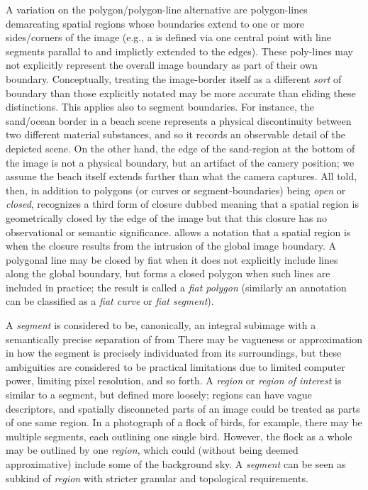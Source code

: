 {\begin{description}
A variation on the polygon/polygon-line alternative 
are polygon-lines demarcating spatial regions 
whose boundaries extend to one or more sides/corners 
of the image (e.g., a  is defined 
via one central point with line segments 
parallal to and implictly 
extended to the edges).  These poly-lines 
may not explicitly represent the overall image 
boundary as part of their own boundary.  
Conceptually, treating the image-border itself 
as a different \textit{sort} of boundary than 
those explicitly notated may be more accurate 
than eliding these distinctions.  This 
applies also to segment boundaries.  For instance, 
the sand/ocean border in a beach scene represents 
a physical discontinuity between two different 
material substances, and so it records an 
observable detail of the depicted scene.  
On the other hand, the edge of the sand-region 
at the bottom of the image is not a physical 
boundary, but an artifact of the camery position; 
we assume the beach itself extends further than 
what the camera captures.  All told, then, 
in addition to polygons (or curves or segment-boundaries) 
being \textit{open} or \textit{closed}, \AXFI{} 
recognizes a third form of closure dubbed 
 meaning that a spatial region is 
geometrically closed by the edge of the image but 
that this closure has no observational or semantic 
significance.  \lAXFI{} allows a notation that 
a spatial region is  when the closure 
results from the intrusion of the global image boundary.  
A polygonal line may be closed by fiat when it does 
not explicitly include lines along the global boundary, 
but forms a closed polygon when such lines are 
included in practice; the result is called a 
\textit{fiat polygon} (similarly an annotation 
can be classified as a \textit{fiat curve} or 
\textit{fiat segment}).
   

\item[Segments and Regions]  A \textit{segment} is 
considered to be, canonically, an integral 
subimage with a semantically precise 
separation of  from   
There may be vagueness or approximation 
in how the segment is precisely individuated 
from its surroundings, but these ambiguities 
are considered to be practical limitations 
due to limited computer power, limiting pixel 
resolution, and so forth.  A \textit{region} 
or \textit{region of interest} is similar to a 
segment, but defined more loosely; regions 
can have vague descriptors, and spatially 
disconneted parts of an image could be treated 
as parts of one same region.  In a photograph 
of a flock of birds, for example, there may be 
multiple segments, each outlining one single bird.  
However, the flock as a whole may be outlined 
by one \textit{region}, which could (without 
being deemed approximative) include some of the 
background sky.  A \textit{segment} can be seen 
as subkind of \textit{region} with stricter 
granular and topological requirements. 


\end{description}}
